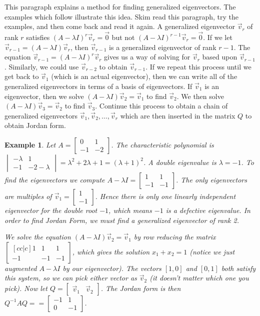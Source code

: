\documentclass[10pt]{article}
\theoremstyle{plain}
\theoremstyle{box}
\newtheorem{example}{Example}
\begin{document}
This paragraph explains a method for finding generalized eigenvectors.  The examples which follow illustrate this idea. Skim read this paragraph, try the examples, and then come back and read it again. A generalized eigenvector $\vec v_r$ of rank $r$ satisfies $(A-\lambda I)^r\vec v_r=\vec 0$ but not $(A-\lambda I)^{r-1}\vec v_r=\vec 0$.  If we let $\vec v_{r-1}= (A-\lambda I)\vec v_r$, then $\vec v_{r-1}$ is a generalized eigenvector of rank $r-1$. The equation $\vec v_{r-1}=(A-\lambda I)^r\vec v_r$ gives us a way of solving for $\vec v_{r}$ based upon $\vec v_{r-1}$. Similarly, we could use $\vec v_{r-2}$ to obtain $\vec v_{r-1}$.   If we repeat this process until we get back to $\vec v_1$ (which is an actual eigenvector), then we can write all of the generalized eigenvectors in terms of a basis of eigenvectors. If $\vec v_1$ is an eigenvector, then we solve $(A-\lambda I)\vec v_2 =\vec v_1$ to find $\vec v_2$. We then solve  $(A-\lambda I)\vec v_3 =\vec v_2$ to find $\vec v_3$. Continue this process to obtain a chain of generalized eigenvectors $\vec v_1, \vec v_2, \ldots, \vec v_r$ which are then inserted in the matrix $Q$ to obtain Jordan form.

\begin{example}
Let $A=\begin {bmatrix} 0&1\\-1&-2\end {bmatrix}$. The characteristic polynomial is $\begin {vmatrix} -\lambda&1\\-1&-2-\lambda\end {vmatrix}= \lambda^2+2\lambda+1=(\lambda+1)^2$. A double eigenvalue is $\lambda=-1$.  To find the eigenvectors we compute {$A-\lambda I = \begin {bmatrix} 1&1\\-1&-1\end {bmatrix} $}. The only eigenvectors are multiples of $\vec v_1 = \begin {bmatrix} 1\\-1\end {bmatrix}$. Hence there is only one linearly independent eigenvector for the double root $-1$, which means $-1$ is a defective eigenvalue. In order to find Jordan Form, we must find a generalized eigenvector of rank 2. 

We solve the equation 
$(A-\lambda I)\vec v_2=\vec v_1$ by row reducing the matrix 
$\begin {bmatrix}[cc|c] 1&1&1\\-1&-1&-1\end {bmatrix}$, which gives the solution $x_1+x_2=1$ (notice we just augmented $A-\lambda I$ by our eigenvector).  The vectors $[1,0]$ and $[0,1]$ both satisfy this system, so we can pick either vector as $\vec v_2$ (it doesn't matter which one you pick). Now let $Q=\begin{bmatrix}\vec v_1 &\vec v_2\end{bmatrix}$. The Jordan form is then $Q^{-1}AQ = =\begin {bmatrix} -1&1\\0&-1\end {bmatrix}$.  
\end{example}
\end{document}
